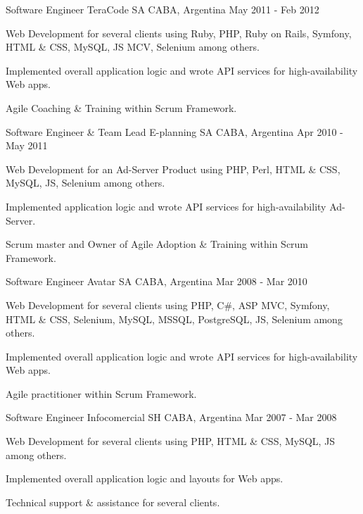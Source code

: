 \begin{cventries}
  \cventry
    {Software Engineer}
    {TeraCode SA}
    {CABA, Argentina}
    {May 2011 - Feb 2012}
    {
      \begin{cvitems}
        \item {Web Development for several clients using Ruby, PHP, Ruby on Rails, Symfony, HTML \& CSS, MySQL, JS MCV, Selenium among others.}
        \item {Implemented overall application logic and wrote API services for high-availability Web apps.}
        \item {Agile Coaching \& Training within Scrum Framework.}
      \end{cvitems}
    }
   
  \cventry
    {Software Engineer \& Team Lead}
    {E-planning SA}
    {CABA, Argentina}
    {Apr 2010 - May 2011}
    {
      \begin{cvitems}
        \item {Web Development for an Ad-Server Product using PHP, Perl, HTML \& CSS, MySQL, JS, Selenium among others.}
        \item {Implemented application logic and wrote API services for high-availability Ad-Server.}
        \item {Scrum master and Owner of Agile Adoption \& Training within Scrum Framework.}
      \end{cvitems}
    } 
   
  \cventry
    {Software Engineer}
    {Avatar SA}
    {CABA, Argentina}
    {Mar 2008 - Mar 2010}
    {
      \begin{cvitems}
        \item {Web Development for several clients using PHP, C\#, ASP MVC, Symfony, HTML \& CSS, Selenium, MySQL, MSSQL, PostgreSQL, JS, Selenium among others.}
        \item {Implemented overall application logic and wrote API services for high-availability Web apps.}
        \item {Agile practitioner within Scrum Framework.}
      \end{cvitems}
    } 
      
  \cventry
    {Software Engineer}
    {Infocomercial SH}
    {CABA, Argentina}
    {Mar 2007 - Mar 2008}
    {
      \begin{cvitems}
        \item {Web Development for several clients using PHP, HTML \& CSS, MySQL, JS among others.}
        \item {Implemented overall application logic and layouts for Web apps.}
        \item {Technical support \& assistance for several clients.}
      \end{cvitems}
    }  
\end{cventries}